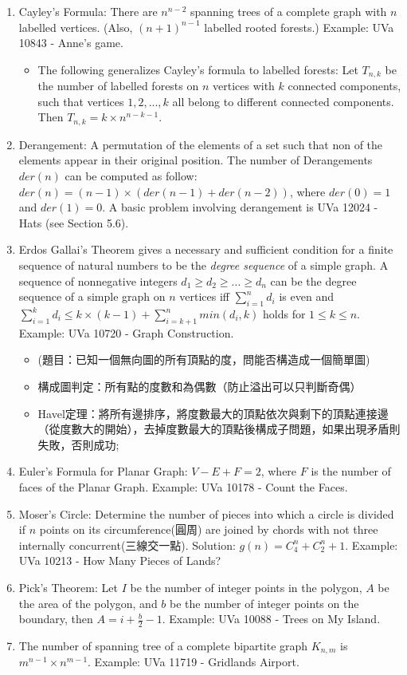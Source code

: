 
\begin{enumerate}
\item Cayley's Formula: There are $n^{n-2}$ spanning trees of a complete graph with $n$ labelled vertices. (Also, $(n+1)^{n-1}$ labelled rooted forests.) Example: UVa 10843 - Anne's game.
	\begin{itemize}
		\item The following generalizes Cayley's formula to labelled forests: Let $T_{n,k}$ be the number of labelled forests on $n$ vertices with $k$ connected components, such that vertices $1, 2, ..., k$ all belong to different connected components. Then $T_{n,k} = k\times n^{n − k − 1}$.
	\end{itemize}
\item Derangement: A permutation of the elements of a set such that non of the elements appear in their original position. The number of Derangements $der(n)$ can be computed as follow: $der(n) = (n-1) \times (der(n-1) + der(n-2))$, where $der(0) = 1$ and $der(1) = 0$. A basic problem involving derangement is UVa 12024 - Hats (see Section 5.6).
\item  Erdos Gallai's Theorem gives a necessary and sufficient condition for a finite sequence of natural numbers to be the \emph{degree sequence} of a simple graph. A sequence of nonnegative integers $d_1 \geq d_2 \geq ... \geq d_n$ can be the degree sequence of a simple graph on $n$ vertices iff $\sum_{i=1}^{n} d_i$ is even and $\sum_{i=1}^{k} d_i \leq k \times (k-1) + \sum_{i=k+1}^{n}min(d_i, k)$ holds for $1 \leq k \leq n$. Example: UVa 10720 - Graph Construction.
	\begin{itemize}
	\item (題目：已知一個無向圖的所有頂點的度，問能否構造成一個簡單圖)
	\item 構成圖判定：所有點的度數和為偶數（防止溢出可以只判斷奇偶）
	\item Havel定理：將所有邊排序，將度數最大的頂點依次與剩下的頂點連接邊（從度數大的開始），去掉度數最大的頂點後構成子問題，如果出現矛盾則失敗，否則成功;
	\end{itemize}
\item Euler's Formula for Planar Graph: $V-E+F=2$, where $F$ is the number of faces of the Planar Graph. Example: UVa 10178 - Count the Faces.
\item Moser's Circle: Determine the number of pieces into which a circle is divided if $n$ points on its circumference(圓周) are joined by chords with not three internally concurrent(三線交一點). Solution: $g(n) = C_{4}^{n} + C_{2}^{n} + 1$. Example: UVa 10213 - How Many Pieces of Lands?
\item Pick's Theorem: Let $I$ be the number of integer points in the polygon, $A$ be the area of the polygon, and $b$ be the number of integer points on the boundary, then $A = i + \frac{b}{2} - 1$. Example: UVa 10088 - Trees on My Island.
\item The number of spanning tree of a complete bipartite graph $K_{n,m}$ is $m^{n-1} \times n^{m-1}$. Example: UVa 11719 - Gridlands Airport.
	
\end{enumerate}